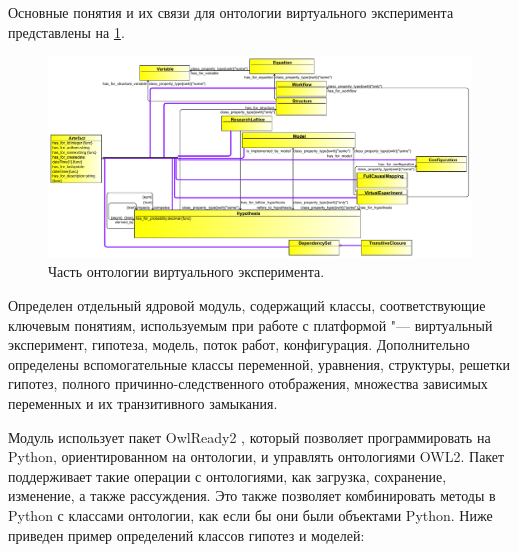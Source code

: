 Основные понятия и их связи для онтологии виртуального эксперимента представлены на \cref{fig:ve_schema}.

\begin{figure}[h!]
    \centering
    \includegraphics[width=\linewidth]{images/ve_schema2.pdf}
    \caption{Часть онтологии виртуального эксперимента.}\label{fig:ve_schema}
\end{figure}

Определен отдельный ядровой модуль, содержащий классы, соответствующие ключевым понятиям, используемым при работе 
с платформой "--- виртуальный эксперимент, гипотеза, модель, поток работ, конфигурация. Дополнительно определены 
вспомогательные классы переменной, уравнения, структуры, решетки гипотез, полного причинно-следственного отображения, 
множества зависимых переменных и их транзитивного замыкания. 

Модуль использует пакет OwlReady2 \cite{Lamy2017}, который позволяет программировать на Python, ориентированном на 
онтологии, и управлять онтологиями OWL2. Пакет поддерживает такие операции с онтологиями, как загрузка, сохранение, 
изменение, а также рассуждения. Это также позволяет комбинировать методы в Python с классами онтологии, как если бы 
они были объектами Python. Ниже приведен пример определений классов гипотез и моделей:

